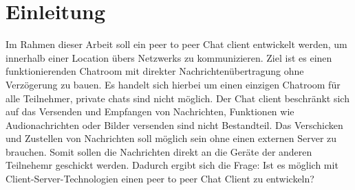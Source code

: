 \section{Einleitung}
Im Rahmen dieser Arbeit soll ein peer to peer Chat client entwickelt werden, um innerhalb einer Location übers Netzwerks zu kommunizieren. 
Ziel ist es einen funktionierenden Chatroom mit direkter Nachrichtenübertragung ohne Verzögerung zu bauen.
Es handelt sich hierbei um einen einzigen Chatroom für alle Teilnehmer, private chats sind nicht möglich. 
Der Chat client beschränkt sich auf das Versenden und Empfangen von Nachrichten, Funktionen wie Audionachrichten oder Bilder versenden sind nicht Bestandteil. 
Das Verschicken und Zustellen von Nachrichten soll möglich sein ohne einen externen Server zu brauchen. 
Somit sollen die Nachrichten direkt an die Geräte der anderen Teilnehemr geschickt werden. 
Dadurch ergibt sich die Frage: Ist es möglich mit Client-Server-Technologien einen peer to peer Chat Client zu entwickeln?